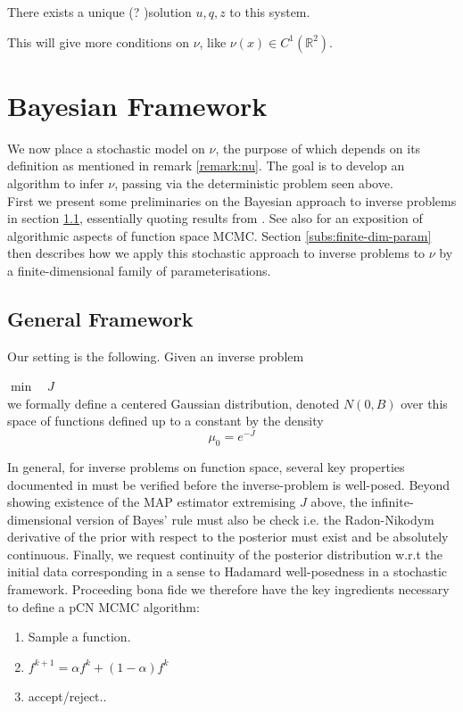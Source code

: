 \documentclass[runningheads]{llncs}
\begin{document}
\begin{theorem}
There exists a unique (? )solution $u, q, z$ to this system.

This will give more conditions on $\nu$, like $\nu(x) \in C^{1}(\mathbb R^2)$. 
\end{theorem}

\section{Bayesian Framework}\label{sec:bayesian}

We now place a stochastic model on $\nu$, the purpose of which depends on its
definition as mentioned in remark \eqref{remark:nu}. The goal is to develop an
algorithm to infer $\nu$, passing via the deterministic problem seen above.\\

First we present some preliminaries on the Bayesian approach to inverse problems
in section \ref{subs:gf}, essentially quoting results from
\cite{dashti2017bayesian}.  See also \cite{cotter2013mcmc} for an exposition of
algorithmic aspects of function space MCMC. Section \ref{subs:finite-dim-param}
then describes how we apply this stochastic approach to inverse problems to
$\nu$ by a finite-dimensional family of parameterisations.

\subsection{General Framework}\label{subs:gf}
Our setting is the following. Given an inverse problem

$\min\quad J$\\

we formally define a centered Gaussian distribution, denoted $N(0, B)$ over this
space of functions defined up to a constant by the density
\[
\mu_0 = e^{-J}
\]

In general, for inverse problems on function space, several key properties
documented in \cite{?} must be verified before the inverse-problem is
well-posed. Beyond showing existence of the MAP estimator extremising $J$ above,
the infinite-dimensional version of Bayes' rule must also be check i.e. the
Radon-Nikodym derivative of the prior with respect to the posterior must exist
and be absolutely continuous. Finally, we request continuity of the posterior
distribution w.r.t the initial data corresponding in a sense to Hadamard
well-posedness in a stochastic framework. Proceeding bona fide we therefore have
the key ingredients necessary to define a pCN MCMC algorithm:
\begin{enumerate}
\item Sample a function.
\item $f^{k+1} = \alpha f^k + (1-\alpha) f^k$
\item accept/reject..
\end{enumerate}
\end{document}
